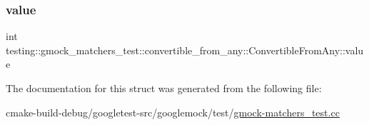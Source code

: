 \subsubsection{\texorpdfstring{value}{value}}
{\footnotesize\ttfamily int testing\+::gmock\+\_\+matchers\+\_\+test\+::convertible\+\_\+from\+\_\+any\+::\+Convertible\+From\+Any\+::value}



The documentation for this struct was generated from the following file\+:\begin{DoxyCompactItemize}
\item 
cmake-\/build-\/debug/googletest-\/src/googlemock/test/\mbox{\hyperlink{gmock-matchers__test_8cc}{gmock-\/matchers\+\_\+test.\+cc}}\end{DoxyCompactItemize}
